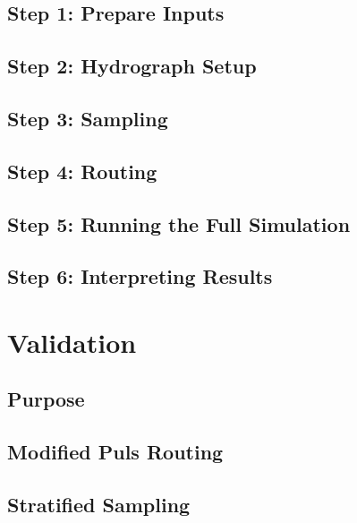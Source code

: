 \documentclass[
  letterpaper,
  DIV=11,
  numbers=noendperiod]{scrreprt}
\begin{document}
\section{Step 1: Prepare Inputs}\label{step-1-prepare-inputs}

\section{Step 2: Hydrograph Setup}\label{step-2-hydrograph-setup}

\section{Step 3: Sampling}\label{step-3-sampling}

\section{Step 4: Routing}\label{step-4-routing}

\section{Step 5: Running the Full
Simulation}\label{step-5-running-the-full-simulation}

\section{Step 6: Interpreting
Results}\label{step-6-interpreting-results}


\chapter{Validation}\label{validation}

\section{Purpose}\label{purpose-1}

\section{Modified Puls Routing}\label{modified-puls-routing}

\section{Stratified Sampling}\label{stratified-sampling}
\end{document}
